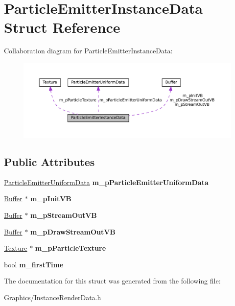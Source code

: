 \hypertarget{structParticleEmitterInstanceData}{}\section{Particle\+Emitter\+Instance\+Data Struct Reference}
\label{structParticleEmitterInstanceData}


Collaboration diagram for Particle\+Emitter\+Instance\+Data\+:\nopagebreak
\begin{figure}[H]
\begin{center}
\leavevmode
\includegraphics[width=350pt]{structParticleEmitterInstanceData__coll__graph}
\end{center}
\end{figure}
\subsection*{Public Attributes}
\begin{DoxyCompactItemize}
\item 
\mbox{\label{structParticleEmitterInstanceData_a2c577a1a5d79f35f1f63f3c049c08276}} 
\hyperlink{structParticleEmitterUniformData}{Particle\+Emitter\+Uniform\+Data} {\bfseries m\+\_\+p\+Particle\+Emitter\+Uniform\+Data}
\item 
\mbox{\label{structParticleEmitterInstanceData_a27db7c8d0ec7a7bd854aa029e78c04a6}} 
\hyperlink{classBuffer}{Buffer} $\ast$ {\bfseries m\+\_\+p\+Init\+VB}
\item 
\mbox{\label{structParticleEmitterInstanceData_a01e9ae7bfec9166441d91ade91ec8bb7}} 
\hyperlink{classBuffer}{Buffer} $\ast$ {\bfseries m\+\_\+p\+Stream\+Out\+VB}
\item 
\mbox{\label{structParticleEmitterInstanceData_ad504b778677ed6a7b0f15debd706324b}} 
\hyperlink{classBuffer}{Buffer} $\ast$ {\bfseries m\+\_\+p\+Draw\+Stream\+Out\+VB}
\item 
\mbox{\label{structParticleEmitterInstanceData_ac6f11a17562759c6a609c6ed76788958}} 
\hyperlink{classTexture}{Texture} $\ast$ {\bfseries m\+\_\+p\+Particle\+Texture}
\item 
\mbox{\label{structParticleEmitterInstanceData_a5f8696d0c248e3ca51b705ed50240149}} 
bool {\bfseries m\+\_\+first\+Time}
\end{DoxyCompactItemize}


The documentation for this struct was generated from the following file\+:\begin{DoxyCompactItemize}
\item 
Graphics/Instance\+Render\+Data.\+h\end{DoxyCompactItemize}
